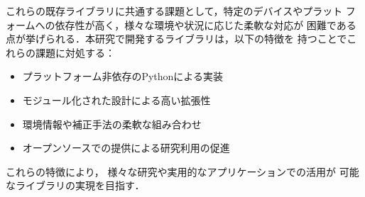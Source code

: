 これらの既存ライブラリに共通する課題として，特定のデバイスやプラット
フォームへの依存性が高く，様々な環境や状況に応じた柔軟な対応が
困難である点が挙げられる．本研究で開発するライブラリは，以下の特徴を
持つことでこれらの課題に対処する：

\begin{itemize}
    \item プラットフォーム非依存のPythonによる実装
    \item モジュール化された設計による高い拡張性
    \item 環境情報や補正手法の柔軟な組み合わせ
    \item オープンソースでの提供による研究利用の促進
\end{itemize}

これらの特徴により，
様々な研究や実用的なアプリケーションでの活用が
可能なライブラリの実現を目指す．

